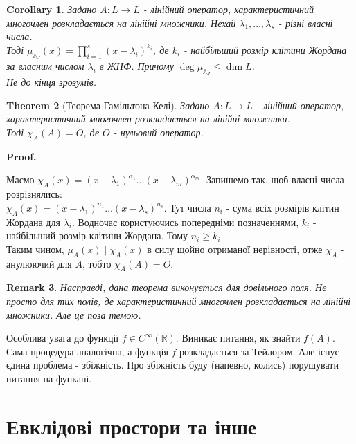 \documentclass[a4paper, 10pt]{article}
\makeatletter
\theoremstyle{theoremdd}
\newtheorem{theorem}{Theorem}[subsection]
\newtheorem{remark}[theorem]{Remark}
\newtheorem{corollary}[theorem]{Corollary}
\renewenvironment{proof}[1][Proof.\\]{\par
\pushQED{\hfill \qed}%
\normalfont \topsep6\p@\@plus6\p@\relax
\trivlist
\item\relax
{\bfseries
#1\@addpunct{.}}\hspace\labelsep\ignorespaces
}{%
\popQED\endtrivlist\@endpefalse
}
\makeatother
\begin{document}
\begin{corollary}
Задано $A \colon L \to L$ - лінійний оператор, характеристичний многочлен розкладається на лінійні множники. Нехай $\lambda_1,\dots,\lambda_s$ - різні власні числа.\\
Тоді $\mu_{\mathbb{A}_J}(x) = \displaystyle\prod_{i=1}^s (x - \lambda_i)^{k_i}$, де $k_i$ - найбільший розмір клітини Жордана за власним числом $\lambda_i$ в ЖНФ. Причому $\deg \mu_{\mathbb{A}_J} \leq \dim L$.\\
\textit{Не до кінця зрозумів.}
\end{corollary}

\begin{theorem}[Теорема Гамільтона-Келі]
Задано $A \colon L \to L$ - лінійний оператор, характеристичний многочлен розкладається на лінійні множники.\\ 
Тоді $\chi_A (A) = O$, де $O$ - нульовий оператор.
\end{theorem}

\begin{proof}
Маємо $\chi_A(x) = (x-\lambda_1)^{\alpha_1} \dots (x-\lambda_m)^{\alpha_m}$. Запишемо так, щоб власні числа розрізнялись:\\
$\chi_A(x) = (x-\lambda_1)^{n_1} \dots (x-\lambda_s)^{n_s}$. Тут числа $n_i$ - сума всіх розмірів клітин Жордана для $\lambda_i$. Водночас користуючись попередніми позначеннями, $k_i$ - найбільший розмір клітини Жордана. Тому $n_i \geq k_i$.\\
Таким чином, $\mu_A(x) \mid \chi_A(x)$ в силу щойно отриманої нерівності, отже $\chi_A$ - анулюючий для $A$, тобто $\chi_A(A) = O$.
\end{proof}

\begin{remark}
Насправді, дана теорема виконується для довільного поля. Не просто для тих полів, де характеристичний многочлен розкладається на лінійні множники. Але це поза темою.
\end{remark}
\noindent
Особлива увага до функції $f \in C^{\infty}(\mathbb{R})$. Виникає питання, як знайти $f(A)$. Сама процедура аналогічна, а функція $f$ розкладається за Тейлором. Але існує єдина проблема - збіжність. Про збіжність буду (напевно, колись) порушувати питання на функані.
\newpage

\section{Евклідові простори та інше}
\end{document}
